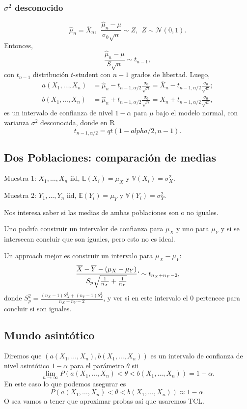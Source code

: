 \documentclass[a4paper,12pt]{article}
\theoremstyle{definition}
\numberwithin{prop}{section}
\theoremstyle{remark}
\numberwithin{ej_subseccion}{subsection}
\begin{document}
	\subsubsection*{$\sigma^2$ desconocido}
	$$\hat{\mu}_n=\overline{X}_n,\ \ \frac{\hat{\mu}_n-\mu}{\sigma_0\sqrt{n}}\sim Z,\ \ Z\sim\mathcal{N}(0,1).$$
	Entonces,
	$$\frac{\hat{\mu}_n-\mu}{S\sqrt{n}}\sim t_{n-1},$$
	con $t_{n-1}$ distribución $t$-student con $n-1$ grados de libertad. Luego,
	\begin{align*}
	a(X_1,\dots,X_n)&=\hat{\mu}_n-t_{n-1,\alpha/2}\frac{\sigma_0}{\sqrt{n}}=\overline{X}_n-t_{n-1,\alpha/2}\frac{\sigma_0}{\sqrt{n}};\\ b(X_1,\dots,X_n)&=\hat{\mu}_n+t_{n-1,\alpha/2}\frac{\sigma_0}{\sqrt{n}}=\overline{X}_n+t_{n-1,\alpha/2}\frac{\sigma_0}{\sqrt{n}},
	\end{align*}
	es un intervalo de confianza de nivel $1-\alpha$ para $\mu$ bajo el modelo normal, con varianza $\sigma^2$ desconocida, donde en R
	$$t_{n-1,\alpha/2} = qt(1-alpha/2,n-1).$$
	
	\subsection*{Dos Poblaciones: comparación de medias}
	
	Muestra 1: $X_1,\dots,X_n$ iid, $\mathbb{E}(X_i)=\mu_X$ y $\mathbb{V}(X_i)=\sigma_X^2$.
	
	Muestra 2: $Y_1,\dots,Y_n$ iid, $\mathbb{E}(Y_i)=\mu_Y$ y $\mathbb{V}(Y_i)=\sigma_Y^2$.
	
	Nos interesa saber si las medias de ambas poblaciones son o no iguales.
	
	Uno podría construir un intervalor de confianza para $\mu_X$ y uno para $\mu_Y$ y si se intersecan concluir que son iguales, pero esto no es ideal.
	
	Un approach mejor es construir un intervalo para $\mu_X - \mu_Y$:
	$$\frac{\overline{X}-\overline{Y}-(\mu_X-\mu_Y)}{S_p\sqrt{\frac{1}{n_X}+\frac{1}{n_Y}}}`\sim t_{n_X+n_Y-2},$$
	donde $S_p^2=\frac{(n_X-1)S_X^2+(n_Y-1)S_Y^2}{n_X+n_Y-2}$, y ver si en este intervalo el 0 pertenece para concluir si son iguales.
	
	\subsection*{Mundo asintótico}
	
	Diremos que $(a(X_1,\dots,X_n),b(X_1,\dots,X_n))$ es un intervalo de confianza de nivel asintótico $1-\alpha$ para el parámetro $\theta$ sii
	$$\lim_{n\to\infty}P(a(X_1,\dots,X_n)<\theta<b(X_1,\dots,X_n))=1-\alpha.$$
	En este caso lo que podemos asegurar es 
	$$P(a(X_1,\dots,X_n)<\theta<b(X_1,\dots,X_n))\approx1-\alpha.$$
	O sea vamos a tener que aproximar probas así que usaremos TCL.
	
\end{document}
